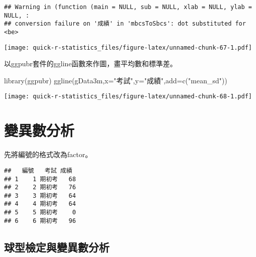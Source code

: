 \documentclass[
]{book}
\newenvironment{Shaded}{\begin{snugshade}}{\end{snugshade}}
\newcommand{\AttributeTok}[1]{\textcolor[rgb]{0.77,0.63,0.00}{#1}}
\newcommand{\FunctionTok}[1]{\textcolor[rgb]{0.00,0.00,0.00}{#1}}
\newcommand{\NormalTok}[1]{#1}
\newcommand{\OtherTok}[1]{\textcolor[rgb]{0.56,0.35,0.01}{#1}}
\newcommand{\SpecialCharTok}[1]{\textcolor[rgb]{0.00,0.00,0.00}{#1}}
\newcommand{\StringTok}[1]{\textcolor[rgb]{0.31,0.60,0.02}{#1}}
\begin{document}
\begin{verbatim}
## Warning in (function (main = NULL, sub = NULL, xlab = NULL, ylab = NULL, :
## conversion failure on '成績' in 'mbcsToSbcs': dot substituted for <be>
\end{verbatim}

\texttt{[image: quick-r-statistics\_files/figure-latex/unnamed-chunk-67-1.pdf]}

以ggpubr套件的ggline函數來作圖，畫平均數和標準差。

\begin{Shaded}
\begin{Highlighting}[]
\FunctionTok{library}\NormalTok{(ggpubr)}
\FunctionTok{ggline}\NormalTok{(gData3m,}\AttributeTok{x=}\StringTok{"考試"}\NormalTok{,}\AttributeTok{y=}\StringTok{"成績"}\NormalTok{,}\AttributeTok{add=}\FunctionTok{c}\NormalTok{(}\StringTok{"mean\_sd"}\NormalTok{))}
\end{Highlighting}
\end{Shaded}

\texttt{[image: quick-r-statistics\_files/figure-latex/unnamed-chunk-68-1.pdf]}

\hypertarget{ux8b8aux7570ux6578ux5206ux6790}{%
\section{變異數分析}\label{ux8b8aux7570ux6578ux5206ux6790}}

先將編號的格式改為factor。

\begin{Shaded}
\end{Shaded}

\begin{verbatim}
##   編號   考試 成績
## 1    1 期初考   68
## 2    2 期初考   76
## 3    3 期初考   64
## 4    4 期初考   64
## 5    5 期初考    0
## 6    6 期初考   96
\end{verbatim}

\hypertarget{ux7403ux578bux6aa2ux5b9aux8207ux8b8aux7570ux6578ux5206ux6790}{%
\subsection{球型檢定與變異數分析}\label{ux7403ux578bux6aa2ux5b9aux8207ux8b8aux7570ux6578ux5206ux6790}}
\end{document}
